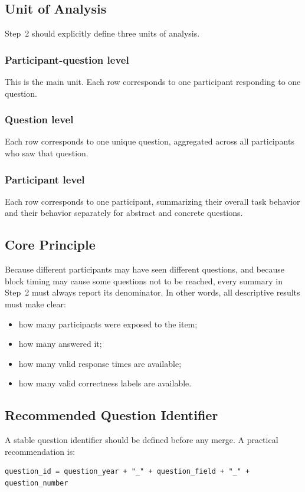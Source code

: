 \subsection{Unit of Analysis}
Step~2 should explicitly define three units of analysis.

\subsubsection*{Participant-question level}
This is the main unit.
Each row corresponds to one participant responding to one question.

\subsubsection*{Question level}
Each row corresponds to one unique question, aggregated across all participants who saw that question.

\subsubsection*{Participant level}
Each row corresponds to one participant, summarizing their overall task behavior and their behavior separately for abstract and concrete questions.

\subsection{Core Principle}
Because different participants may have seen different questions, and because block timing may cause some questions not to be reached, every summary in Step~2 must always report its denominator.
In other words, all descriptive results must make clear:
\begin{itemize}
    \item how many participants were exposed to the item;
    \item how many answered it;
    \item how many valid response times are available;
    \item how many valid correctness labels are available.
\end{itemize}

\subsection{Recommended Question Identifier}
A stable question identifier should be defined before any merge.
A practical recommendation is:
\begin{verbatim}
question_id = question_year + "_" + question_field + "_" + question_number
\end{verbatim}

